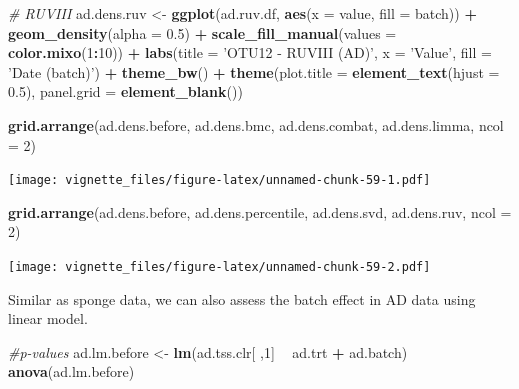 \documentclass[]{book}
\newenvironment{Shaded}{\begin{snugshade}}{\end{snugshade}}
\newcommand{\KeywordTok}[1]{\textcolor[rgb]{0.13,0.29,0.53}{\textbf{#1}}}
\newcommand{\DataTypeTok}[1]{\textcolor[rgb]{0.13,0.29,0.53}{#1}}
\newcommand{\DecValTok}[1]{\textcolor[rgb]{0.00,0.00,0.81}{#1}}
\newcommand{\FloatTok}[1]{\textcolor[rgb]{0.00,0.00,0.81}{#1}}
\newcommand{\StringTok}[1]{\textcolor[rgb]{0.31,0.60,0.02}{#1}}
\newcommand{\CommentTok}[1]{\textcolor[rgb]{0.56,0.35,0.01}{\textit{#1}}}
\newcommand{\OperatorTok}[1]{\textcolor[rgb]{0.81,0.36,0.00}{\textbf{#1}}}
\newcommand{\NormalTok}[1]{#1}
\begin{document}
\begin{Shaded}
\begin{Highlighting}[]
\CommentTok{# RUVIII}
\NormalTok{ad.dens.ruv <-}\StringTok{ }\KeywordTok{ggplot}\NormalTok{(ad.ruv.df, }\KeywordTok{aes}\NormalTok{(}\DataTypeTok{x =}\NormalTok{ value, }\DataTypeTok{fill =}\NormalTok{ batch)) }\OperatorTok{+}\StringTok{ }
\StringTok{  }\KeywordTok{geom_density}\NormalTok{(}\DataTypeTok{alpha =} \FloatTok{0.5}\NormalTok{) }\OperatorTok{+}\StringTok{ }\KeywordTok{scale_fill_manual}\NormalTok{(}\DataTypeTok{values =} \KeywordTok{color.mixo}\NormalTok{(}\DecValTok{1}\OperatorTok{:}\DecValTok{10}\NormalTok{)) }\OperatorTok{+}\StringTok{ }
\StringTok{  }\KeywordTok{labs}\NormalTok{(}\DataTypeTok{title =} \StringTok{'OTU12 - RUVIII (AD)'}\NormalTok{, }\DataTypeTok{x =} \StringTok{'Value'}\NormalTok{, }\DataTypeTok{fill =} \StringTok{'Date (batch)'}\NormalTok{) }\OperatorTok{+}\StringTok{ }
\StringTok{  }\KeywordTok{theme_bw}\NormalTok{() }\OperatorTok{+}\StringTok{ }\KeywordTok{theme}\NormalTok{(}\DataTypeTok{plot.title =} \KeywordTok{element_text}\NormalTok{(}\DataTypeTok{hjust =} \FloatTok{0.5}\NormalTok{), }
                     \DataTypeTok{panel.grid =} \KeywordTok{element_blank}\NormalTok{())}
\end{Highlighting}
\end{Shaded}

\begin{Shaded}
\begin{Highlighting}[]
\KeywordTok{grid.arrange}\NormalTok{(ad.dens.before, ad.dens.bmc, }
\NormalTok{             ad.dens.combat, ad.dens.limma, }\DataTypeTok{ncol =} \DecValTok{2}\NormalTok{)}
\end{Highlighting}
\end{Shaded}

\texttt{[image: vignette\_files/figure-latex/unnamed-chunk-59-1.pdf]}

\begin{Shaded}
\begin{Highlighting}[]
\KeywordTok{grid.arrange}\NormalTok{(ad.dens.before, ad.dens.percentile, }
\NormalTok{             ad.dens.svd, ad.dens.ruv, }\DataTypeTok{ncol =} \DecValTok{2}\NormalTok{)}
\end{Highlighting}
\end{Shaded}

\texttt{[image: vignette\_files/figure-latex/unnamed-chunk-59-2.pdf]}

Similar as sponge data, we can also assess the batch effect in AD data
using linear model.

\begin{Shaded}
\begin{Highlighting}[]
\CommentTok{#p-values}
\NormalTok{ad.lm.before <-}\StringTok{ }\KeywordTok{lm}\NormalTok{(ad.tss.clr[ ,}\DecValTok{1}\NormalTok{] }\OperatorTok{~}\StringTok{ }\NormalTok{ad.trt }\OperatorTok{+}\StringTok{ }\NormalTok{ad.batch)}
\KeywordTok{anova}\NormalTok{(ad.lm.before)}
\end{Highlighting}
\end{Shaded}
\end{document}
